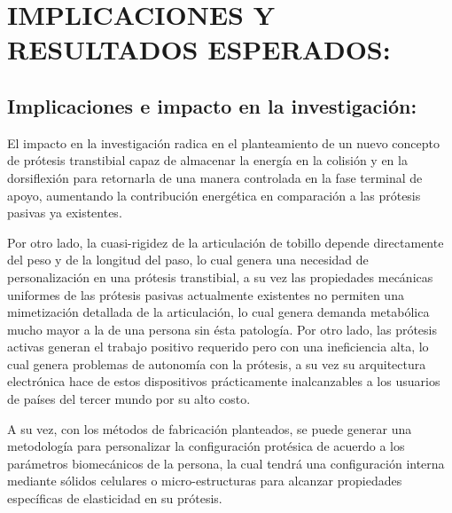\documentclass[12pt,english]{article}
\begin{document}
\section*{IMPLICACIONES Y RESULTADOS ESPERADOS:}

\subsection*{Implicaciones e impacto en la investigación:}

El impacto en la investigación radica en el planteamiento de un nuevo
concepto de prótesis transtibial capaz de almacenar la energía en
la colisión y en la dorsiflexión para retornarla de una manera controlada en la fase terminal de apoyo, aumentando la contribución energética en comparación a las prótesis pasivas ya existentes.

Por otro lado, la cuasi-rigidez de la articulación de tobillo depende directamente
del peso y de la longitud del paso, lo cual genera una necesidad de
personalización en una prótesis transtibial, a su vez las propiedades
mecánicas uniformes de las prótesis pasivas actualmente existentes
no permiten una mimetización detallada de la articulación, lo cual
genera demanda metabólica mucho mayor a la de una persona sin ésta
patología. Por otro lado, las prótesis activas generan el trabajo
positivo requerido pero con una ineficiencia alta, lo cual genera
problemas de autonomía con la prótesis, a su vez su arquitectura electrónica
hace de estos dispositivos prácticamente inalcanzables a los usuarios
de países del tercer mundo por su alto costo.

A su vez, con los métodos de fabricación planteados, se puede generar una metodología para personalizar la configuración protésica de acuerdo a los parámetros biomecánicos de la persona, la cual tendrá una configuración interna mediante sólidos celulares o micro-estructuras
para alcanzar propiedades específicas de elasticidad en su prótesis.
\end{document}
